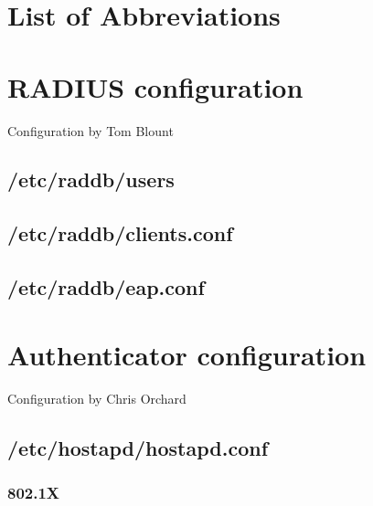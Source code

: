 \section{List of Abbreviations}
\renewcommand{\nomname}{}
\printnomenclature

\section{RADIUS configuration}
\label{sec:Code;sub:radius}
Configuration by Tom Blount
\subsection{/etc/raddb/users}



\subsection{/etc/raddb/clients.conf}



\subsection{/etc/raddb/eap.conf}



\section{Authenticator configuration}
\label{sec:Code;sub:authenticator}
Configuration by Chris Orchard
\subsection{/etc/hostapd/hostapd.conf}
\subsubsection{802.1X}


